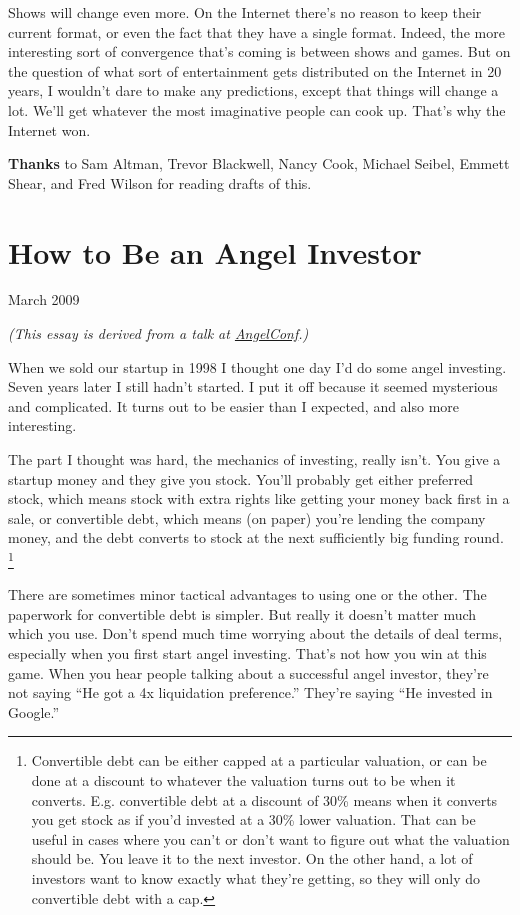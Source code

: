 \documentclass[12pt]{book}
\begin{document}
Shows will change even more. On the Internet there's no reason to keep
their current format, or even the fact that they have a single format.
Indeed, the more interesting sort of convergence that's coming is
between shows and games. But on the question of what sort of
entertainment gets distributed on the Internet in 20 years, I wouldn't
dare to make any predictions, except that things will change a lot.
We'll get whatever the most imaginative people can cook up. That's why
the Internet won.


\textbf{Thanks} to Sam Altman, Trevor Blackwell, Nancy Cook, Michael
Seibel, Emmett Shear, and Fred Wilson for reading drafts of this.
\chapter{How to Be an Angel Investor}

March 2009

\emph{(This essay is derived from a talk at
\href{http://angelconf.org}{AngelConf}.)}

When we sold our startup in 1998 I thought one day I'd do some angel
investing. Seven years later I still hadn't started. I put it off
because it seemed mysterious and complicated. It turns out to be easier
than I expected, and also more interesting.

The part I thought was hard, the mechanics of investing, really isn't.
You give a startup money and they give you stock. You'll probably get
either preferred stock, which means stock with extra rights like getting
your money back first in a sale, or convertible debt, which means (on
paper) you're lending the company money, and the debt converts to stock
at the next sufficiently big funding round. \footnote{Convertible debt can be either capped at a particular valuation,
or can be done at a discount to whatever the valuation turns out to be
when it converts. E.g. convertible debt at a discount of 30\% means when
it converts you get stock as if you'd invested at a 30\% lower
valuation. That can be useful in cases where you can't or don't want to
figure out what the valuation should be. You leave it to the next
investor. On the other hand, a lot of investors want to know exactly
what they're getting, so they will only do convertible debt with a cap.}

There are sometimes minor tactical advantages to using one or the other.
The paperwork for convertible debt is simpler. But really it doesn't
matter much which you use. Don't spend much time worrying about the
details of deal terms, especially when you first start angel investing.
That's not how you win at this game. When you hear people talking about
a successful angel investor, they're not saying ``He got a 4x
liquidation preference.'' They're saying ``He invested in Google.''
\end{document}
